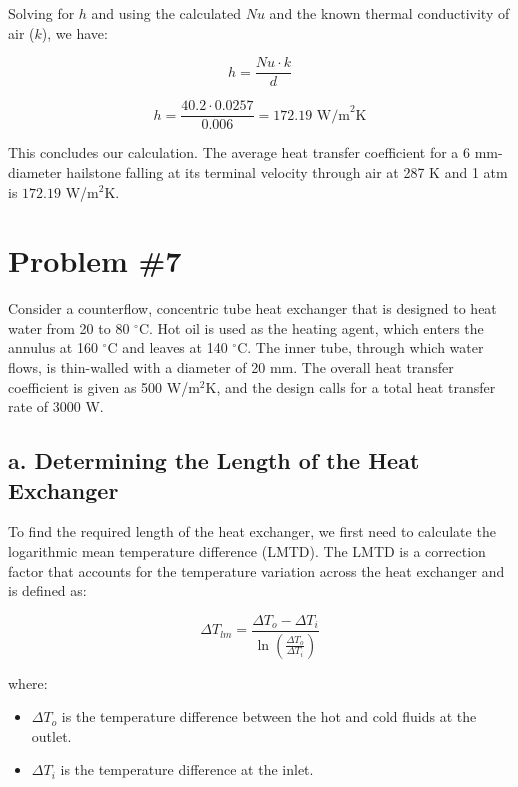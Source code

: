 \documentclass{article}
\numberwithin{equation}{section}
\begin{document}
Solving for \(h\) and using the calculated \(Nu\) and the known thermal conductivity of air (\(k\)), we have:

\begin{equation}
h = \frac{Nu \cdot k}{d}
\end{equation}

\begin{equation}
h = \frac{40.2 \cdot 0.0257}{0.006} = 172.19 \text{ W/m}^2\text{K}
\end{equation}

This concludes our calculation. The average heat transfer coefficient for a 6 mm-diameter hailstone falling at its terminal velocity through air at 287 K and 1 atm is \( 172.19 \) W/m\(^2\)K.

\newpage
\section{Problem \#7}

Consider a counterflow, concentric tube heat exchanger that is designed to heat water from 20 to 80 \( ^{\circ}\)C. Hot oil is used as the heating agent, which enters the annulus at 160 \( ^{\circ}\)C and leaves at 140 \( ^{\circ}\)C. The inner tube, through which water flows, is thin-walled with a diameter of 20 mm. The overall heat transfer coefficient is given as 500 W/m\(^2\)K, and the design calls for a total heat transfer rate of 3000 W.

\subsection*{a. Determining the Length of the Heat Exchanger}

To find the required length of the heat exchanger, we first need to calculate the logarithmic mean temperature difference (LMTD). The LMTD is a correction factor that accounts for the temperature variation across the heat exchanger and is defined as:

\begin{equation}
\Delta T_{lm} = \frac{\Delta T_{o} - \Delta T_{i}}{\ln\left(\frac{\Delta T_{o}}{\Delta T_{i}}\right)}
\end{equation}

where:
\begin{itemize}
    \item \( \Delta T_{o} \) is the temperature difference between the hot and cold fluids at the outlet.
    \item \( \Delta T_{i} \) is the temperature difference at the inlet.
\end{itemize}
\end{document}
